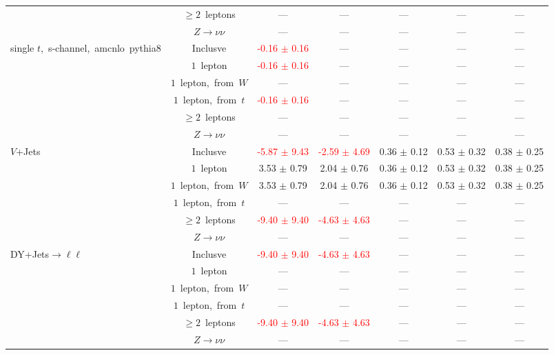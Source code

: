 \documentclass{article}
\begin{document}
\begin{longtable}{|l|c|c|c|c|c|c|}
 & $\ge2$~leptons  & ---  & ---  & ---  & ---  & --- \\* 
 & $Z\rightarrow\nu\nu$  & ---  & ---  & ---  & ---  & --- \\* 
\hline 
\multirow{6}{*}{single $t$,~s-channel,~amcnlo~pythia8} & Inclusve  & \textcolor{red}{ -0.16 $\pm$ 0.16 }  & ---  & ---  & ---  & --- \\* 
 & $1$~lepton  & \textcolor{red}{ -0.16 $\pm$ 0.16 }  & ---  & ---  & ---  & --- \\* 
 & $1$~lepton,~from~$W$  & ---  & ---  & ---  & ---  & --- \\* 
 & $1$~lepton,~from~$t$  & \textcolor{red}{ -0.16 $\pm$ 0.16 }  & ---  & ---  & ---  & --- \\* 
 & $\ge2$~leptons  & ---  & ---  & ---  & ---  & --- \\* 
 & $Z\rightarrow\nu\nu$  & ---  & ---  & ---  & ---  & --- \\* 
\hline 
\multirow{6}{*}{$V$+Jets} & Inclusve  & \textcolor{red}{ -5.87 $\pm$ 9.43 }  & \textcolor{red}{ -2.59 $\pm$ 4.69 }  & 0.36 $\pm$ 0.12  & 0.53 $\pm$ 0.32  & 0.38 $\pm$ 0.25 \\* 
 & $1$~lepton  & 3.53 $\pm$ 0.79  & 2.04 $\pm$ 0.76  & 0.36 $\pm$ 0.12  & 0.53 $\pm$ 0.32  & 0.38 $\pm$ 0.25 \\* 
 & $1$~lepton,~from~$W$  & 3.53 $\pm$ 0.79  & 2.04 $\pm$ 0.76  & 0.36 $\pm$ 0.12  & 0.53 $\pm$ 0.32  & 0.38 $\pm$ 0.25 \\* 
 & $1$~lepton,~from~$t$  & ---  & ---  & ---  & ---  & --- \\* 
 & $\ge2$~leptons  & \textcolor{red}{ -9.40 $\pm$ 9.40 }  & \textcolor{red}{ -4.63 $\pm$ 4.63 }  & ---  & ---  & --- \\* 
 & $Z\rightarrow\nu\nu$  & ---  & ---  & ---  & ---  & --- \\* 
\hline 
\multirow{6}{*}{DY+Jets$\rightarrow\ell\ell$} & Inclusve  & \textcolor{red}{ -9.40 $\pm$ 9.40 }  & \textcolor{red}{ -4.63 $\pm$ 4.63 }  & ---  & ---  & --- \\* 
 & $1$~lepton  & ---  & ---  & ---  & ---  & --- \\* 
 & $1$~lepton,~from~$W$  & ---  & ---  & ---  & ---  & --- \\* 
 & $1$~lepton,~from~$t$  & ---  & ---  & ---  & ---  & --- \\* 
 & $\ge2$~leptons  & \textcolor{red}{ -9.40 $\pm$ 9.40 }  & \textcolor{red}{ -4.63 $\pm$ 4.63 }  & ---  & ---  & --- \\* 
 & $Z\rightarrow\nu\nu$  & ---  & ---  & ---  & ---  & --- \\* 

\end{longtable}
\end{document}
